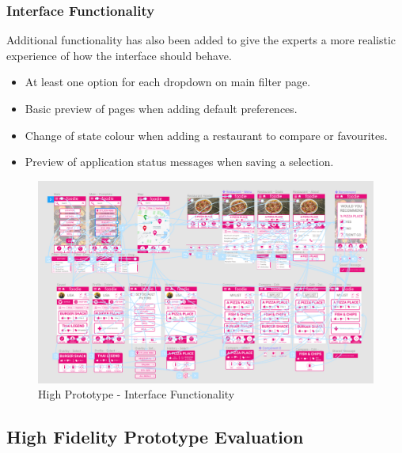 \documentclass[a4 paper, 12pt]{article}
\begin{document}
    \subsubsection{Interface Functionality}
    Additional functionality has also been added to give the experts a more realistic experience of how the interface should behave.
    \begin{itemize}
        \item At least one option for each dropdown on main filter page.
        \item Basic preview of pages when adding default preferences.
        \item Change of state colour when adding a restaurant to compare or favourites.
        \item Preview of application status messages when saving a selection.
    \end{itemize}
    \begin{figure} [H]
        \centering
        \includegraphics[width=\textwidth, frame]
            {./High_Fidelity/High_Report/images/high_proto_func.PNG}  
        \caption{High Prototype - Interface Functionality}
    \end{figure} 



\subsection{High Fidelity Prototype Evaluation}
\end{document}

